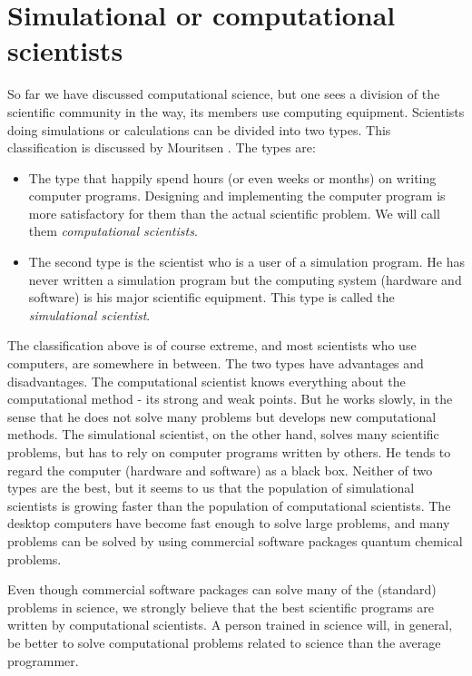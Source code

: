\section{Simulational or computational scientists}
So far we have discussed computational science, but one sees a
division of the scientific community in the way, its members use
computing equipment. Scientists doing simulations or calculations can be
divided into two types. This classification is discussed by Mouritsen
\cite{OGM93}. The types are: 

\begin{itemize}
  \item The type that happily spend hours (or even weeks or months) on
    writing computer programs. Designing and implementing the computer
    program is more satisfactory for them than the actual scientific
    problem. We will call them \textit{computational scientists}.
  \item The second type is the scientist who is a user of a simulation
    program. He has never written a simulation program but the
    computing system (hardware and software) is his major scientific
    equipment. This type is called the \textit{simulational scientist}.
\end{itemize}

The classification above is of course extreme, and most scientists who
use computers, are somewhere in between. The two types have advantages
and disadvantages. The computational scientist knows everything about
the computational method - its strong and weak points. But he works
slowly, in the sense that he does not solve many problems but
develops new computational methods. The simulational scientist, on
the other hand, solves many scientific problems, but has to rely on
computer programs written by others. He tends to regard the computer
(hardware and software) as a black box. Neither of two types are the
best, but it seems to us that the population of simulational
scientists is growing faster than the population of computational
scientists. The desktop computers have become fast enough to solve
large problems, and many problems can be solved by using commercial
software packages \eg quantum chemical problems.

Even though commercial software packages can solve many of the
(standard) problems in science, we strongly believe that the best
scientific programs are written by computational scientists. A person
trained in science will, in general, be better to solve computational
problems related to science than the average programmer.

